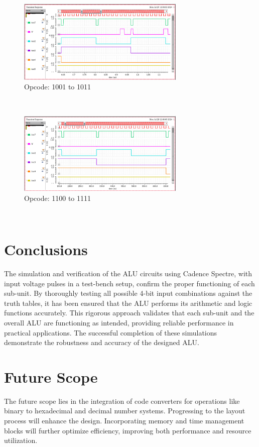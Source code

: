 \documentclass[conference]{IEEEtran}
\begin{document}
\begin{figure}[htbp]
\centerline{\includegraphics[width=8cm,keepaspectratio,]{"Opcode_1001_1011.png"}}
\caption{Opcode: 1001 to 1011}
\label{fig13}
\end{figure}\\
\begin{figure}[htbp]
\centerline{\includegraphics[width=8cm,keepaspectratio,]{"Opcode_1100_1111.png"}}
\caption{Opcode: 1100 to 1111}
\label{fig14}
\end{figure}
\\


\section{Conclusions}\label{F}
The simulation and verification of the ALU circuits using Cadence Spectre, with input voltage pulses in a test-bench setup, confirm the proper functioning of each sub-unit. By thoroughly testing all possible 4-bit input combinations against the truth tables, it has been ensured that the ALU performs its arithmetic and logic functions accurately. This rigorous approach validates that each sub-unit and the overall ALU are functioning as intended, providing reliable performance in practical applications. The successful completion of these simulations demonstrate the robustness and accuracy of the designed ALU. 
\\

\section{Future Scope}\label{G}
The future scope lies in the integration of code converters for operations like binary to hexadecimal and decimal number systems. Progressing to the layout process will enhance the design. Incorporating memory and time management blocks will further optimize efficiency, improving both performance and resource utilization.
\\ 
\end{document}
